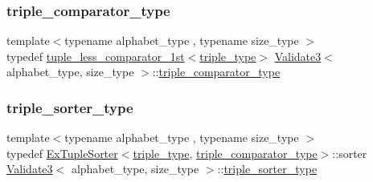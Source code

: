 \mbox{\label{class_validate3_a35d0df8691519c4413a99d0e5739be54}} 
\subsubsection{\texorpdfstring{triple\+\_\+comparator\+\_\+type}{triple\_comparator\_type}}
{\footnotesize\ttfamily template$<$typename alphabet\+\_\+type , typename size\+\_\+type $>$ \\
typedef \hyperlink{structtuple__less__comparator__1st}{tuple\+\_\+less\+\_\+comparator\+\_\+1st}$<$\hyperlink{class_validate3_a5f4a1e8af5876ec1bef35bd0c3068203}{triple\+\_\+type}$>$ \hyperlink{class_validate3}{Validate3}$<$ alphabet\+\_\+type, size\+\_\+type $>$\+::\hyperlink{class_validate3_a35d0df8691519c4413a99d0e5739be54}{triple\+\_\+comparator\+\_\+type}\hspace{0.3cm}{\ttfamily [private]}}

\mbox{\label{class_validate3_ab3d4fd99ae8b2967f0b64b71a28efc66}} 
\subsubsection{\texorpdfstring{triple\+\_\+sorter\+\_\+type}{triple\_sorter\_type}}
{\footnotesize\ttfamily template$<$typename alphabet\+\_\+type , typename size\+\_\+type $>$ \\
typedef \hyperlink{struct_ex_tuple_sorter}{Ex\+Tuple\+Sorter}$<$\hyperlink{class_validate3_a5f4a1e8af5876ec1bef35bd0c3068203}{triple\+\_\+type}, \hyperlink{class_validate3_a35d0df8691519c4413a99d0e5739be54}{triple\+\_\+comparator\+\_\+type}$>$\+::sorter \hyperlink{class_validate3}{Validate3}$<$ alphabet\+\_\+type, size\+\_\+type $>$\+::\hyperlink{class_validate3_ab3d4fd99ae8b2967f0b64b71a28efc66}{triple\+\_\+sorter\+\_\+type}\hspace{0.3cm}{\ttfamily [private]}}

\mbox{\label{class_validate3_a5f4a1e8af5876ec1bef35bd0c3068203}} 
